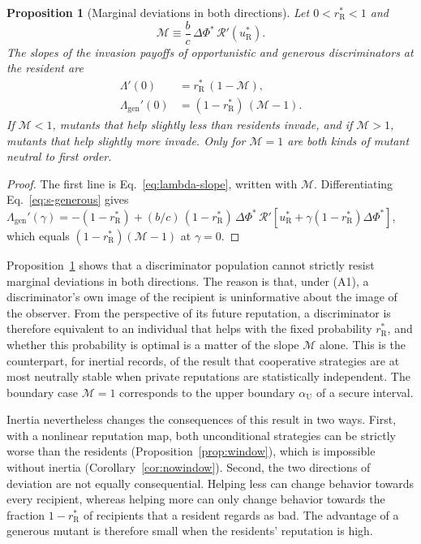 \documentclass[10pt]{wlscirep}
\newcommand{\Rmap}{\mathscr{R}}            %
\newcommand{\rR}{r_{\mathrm{R}}^{*}}
\newcommand{\uR}{u_{\mathrm{R}}^{*}}
\newcommand{\dPhi}{\Delta\Phi^{*}}
\theoremstyle{plain}
\newtheorem{proposition}[lemma]{Proposition}
\theoremstyle{remark}
\begin{document}
\begin{proposition}[Marginal deviations in both directions]\label{prop:twosided}
Let $0<\rR<1$ and
\begin{equation}
\mathcal M\equiv\frac{b}{c}\,\dPhi\,\Rmap'(\uR).
\label{eq:s-M}
\end{equation}
The slopes of the invasion payoffs of opportunistic and generous discriminators at the resident are
\begin{equation}
\begin{aligned}
\Lambda'(0)&=\rR\,(1-\mathcal M),\\
\Lambda_{\mathrm{gen}}'(0)&=(1-\rR)\,(\mathcal M-1).
\end{aligned}
\label{eq:s-twosided}
\end{equation}
If $\mathcal M<1$, mutants that help slightly less than residents invade, and if $\mathcal M>1$, mutants that help slightly more invade. Only for $\mathcal M=1$ are both kinds of mutant neutral to first order.
\end{proposition}
\begin{proof}
The first line is Eq.~\eqref{eq:lambda-slope}, written with $\mathcal M$. Differentiating Eq.~\eqref{eq:s-generous} gives $\Lambda_{\mathrm{gen}}'(\gamma)=-(1-\rR)+(b/c)\,(1-\rR)\,\dPhi\,\Rmap'[\uR+\gamma(1-\rR)\dPhi]$, which equals $(1-\rR)(\mathcal M-1)$ at $\gamma=0$.
\end{proof}

Proposition~\ref{prop:twosided} shows that a discriminator population cannot strictly resist marginal deviations in both directions. The reason is that, under (A1), a discriminator's own image of the recipient is uninformative about the image of the observer. From the perspective of its future reputation, a discriminator is therefore equivalent to an individual that helps with the fixed probability $\rR$, and whether this probability is optimal is a matter of the slope $\mathcal M$ alone. This is the counterpart, for inertial records, of the result that cooperative strategies are at most neutrally stable when private reputations are statistically independent. The boundary case $\mathcal M=1$ corresponds to the upper boundary $\alpha_{\mathrm U}$ of a secure interval.

Inertia nevertheless changes the consequences of this result in two ways. First, with a nonlinear reputation map, both unconditional strategies can be strictly worse than the residents (Proposition~\ref{prop:window}), which is impossible without inertia (Corollary~\ref{cor:nowindow}). Second, the two directions of deviation are not equally consequential. Helping less can change behavior towards every recipient, whereas helping more can only change behavior towards the fraction $1-\rR$ of recipients that a resident regards as bad. The advantage of a generous mutant is therefore small when the residents' reputation is high.
\end{document}
